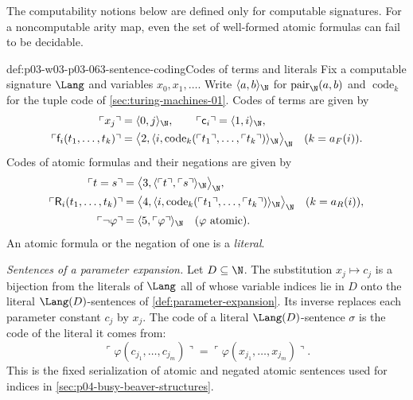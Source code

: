 The computability notions below are defined only for computable signatures.
For a noncomputable arity map, even the set of well-formed atomic formulas
can fail to be decidable.

\begin{hbconvention}{def:p03-w03-p03-063-sentence-coding}{Codes of terms and literals}
Fix a computable signature \(\Lang\) and variables \(x_0,x_1,\ldots\).
Write \(\langle a,b\rangle_{\N}\) for \(\operatorname{pair}_{\N}(a,b)\) and
\(\operatorname{code}_k\) for the tuple code of
\cref{sec:turing-machines-01}.  Codes of terms are given by
\begin{align*}
 \ulcorner x_j\urcorner&=\langle 0,j\rangle_{\N},\qquad
 \ulcorner \mathsf c_i\urcorner=\langle 1,i\rangle_{\N},\\
 \ulcorner \mathsf f_i(t_1,\ldots,t_k)\urcorner
 &=\bigl\langle 2,\langle i,\operatorname{code}_k(\ulcorner t_1\urcorner,\ldots,\ulcorner t_k\urcorner)\rangle_{\N}\bigr\rangle_{\N}
 \quad(k=a_F(i)).
\end{align*}
Codes of atomic formulas and their negations are given by
\begin{align*}
 \ulcorner t=s\urcorner&=\bigl\langle 3,\langle\ulcorner t\urcorner,\ulcorner s\urcorner\rangle_{\N}\bigr\rangle_{\N},\\
 \ulcorner \mathsf R_i(t_1,\ldots,t_k)\urcorner
 &=\bigl\langle 4,\langle i,\operatorname{code}_k(\ulcorner t_1\urcorner,\ldots,\ulcorner t_k\urcorner)\rangle_{\N}\bigr\rangle_{\N}
 \quad(k=a_R(i)),\\
 \ulcorner\neg\varphi\urcorner&=\langle 5,\ulcorner\varphi\urcorner\rangle_{\N}
 \quad(\varphi\text{ atomic}).
\end{align*}
An atomic formula or the negation of one is a \emph{literal}.

\emph{Sentences of a parameter expansion.}  Let \(D\subseteq\N\).  The
substitution \(x_j\mapsto c_j\) is a bijection from the literals of \(\Lang\)
all of whose variable indices lie in \(D\) onto the literal
\(\Lang(D)\)-sentences of \cref{def:parameter-expansion}.  Its inverse
replaces each parameter constant \(c_j\) by \(x_j\).  The code of a literal
\(\Lang(D)\)-sentence \(\sigma\) is the code of the literal it comes from:
\[
 \ulcorner\varphi(c_{j_1},\ldots,c_{j_m})\urcorner
 =\ulcorner\varphi(x_{j_1},\ldots,x_{j_m})\urcorner .
\]
This is the fixed serialization of atomic and negated atomic sentences used
for indices in \cref{sec:p04-busy-beaver-structures}.
\end{hbconvention}

